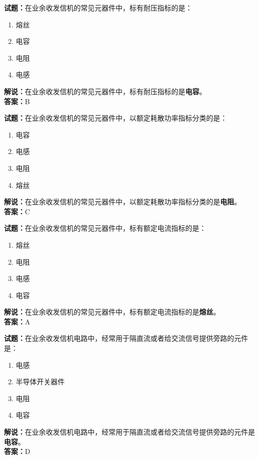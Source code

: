 \documentclass{ctexbook}
\begin{document}
\bigskip


\noindent\textbf{试题：}在业余收发信机的常见元器件中，标有耐压指标的是：
\begin{enumerate}[leftmargin=3em]
\item 熔丝
\item 电容
\item 电阻
\item 电感
\end{enumerate}
\noindent\textbf{解说：}在业余收发信机的常见元器件中，标有耐压指标的是\textbf{电容}。\\\noindent\textbf{答案：}B

\bigskip


\noindent\textbf{试题：}在业余收发信机的常见元器件中，以额定耗散功率指标分类的是：
\begin{enumerate}[leftmargin=3em]
\item 电容
\item 电感
\item 电阻
\item 熔丝
\end{enumerate}
\noindent\textbf{解说：}在业余收发信机的常见元器件中，以额定耗散功率指标分类的是\textbf{电阻}。\\\noindent\textbf{答案：}C

\bigskip


\noindent\textbf{试题：}在业余收发信机的常见元器件中，标有额定电流指标的是：
\begin{enumerate}[leftmargin=3em]
\item 熔丝
\item 电阻
\item 电感
\item 电容
\end{enumerate}
\noindent\textbf{解说：}在业余收发信机的常见元器件中，标有额定电流指标的是\textbf{熔丝}。\\\noindent\textbf{答案：}A


\bigskip


\noindent\textbf{试题：}在业余收发信机电路中，经常用于隔直流或者给交流信号提供旁路的元件是：
\begin{enumerate}[leftmargin=3em]
\item 电感
\item 半导体开关器件
\item 电阻
\item 电容
\end{enumerate}
\noindent\textbf{解说：}在业余收发信机电路中，经常用于隔直流或者给交流信号提供旁路的元件是\textbf{电容}。\\\noindent\textbf{答案：}D
\end{document}

